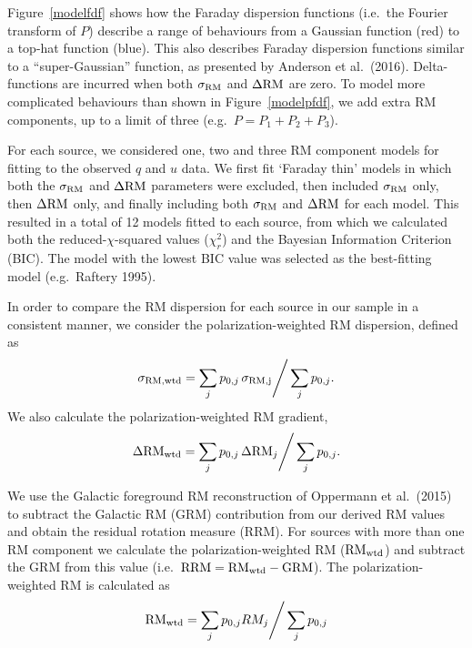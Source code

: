 \documentclass{mnras}
\newcommand*\sigmaRM{\sigma_{\rm RM}}
\newcommand*\sigmaRMwtd{\sigma_{\rm RM, wtd}}
\newcommand*\DeltaRM{\Delta{\rm RM}}
\begin{document}
Figure~\ref{modelfdf} shows how the Faraday dispersion functions (i.e.~the Fourier transform of $P$) describe a range of behaviours from a Gaussian function (red) to a top-hat function (blue). 
This also describes Faraday dispersion functions similar to a ``super-Gaussian'' function, as presented by Anderson et al.~(2016). 
Delta-functions are incurred when both $\sigmaRM$ and $\DeltaRM$ are zero. 
To model more complicated behaviours than shown in Figure~\ref{modelpfdf}, we add extra RM components, up to a limit of three (e.g.~$P=P_1+P_2+P_3$). 

For each source, we considered one, two and three RM component models for fitting to the observed $q$ and $u$ data.  
We first fit `Faraday thin' models in which both the $\sigmaRM$ and $\DeltaRM$ parameters were excluded, then included $\sigmaRM$ only, then $\DeltaRM$ only, and finally including both $\sigmaRM$ and $\DeltaRM$ for each model. This resulted in a total of 12 models fitted to each source, from which we calculated both the reduced-$\chi$-squared values ($\chi^2_r$) and the Bayesian Information Criterion (BIC). The model with the lowest BIC value was selected as the best-fitting model (e.g.~Raftery 1995). 	

In order to compare the RM dispersion for each source in our sample in a consistent manner, we consider the polarization-weighted RM dispersion, defined as
\begin{equation}
\sigmaRMwtd = \sum_j  p_{0,j}  \, \sigma_{\rm RM,j}  \Bigg/ \sum_j p_{0,j} .
\label{sigmaRMwtdeqn}
\end{equation}
We also calculate the polarization-weighted RM gradient,
\begin{equation}
\DeltaRM_{\rm wtd} = \sum_j  p_{0,j}  \, \Delta {\rm RM}_j \Bigg/ \sum_j p_{0,j} .
\label{deltaRMwtdeqn}
\end{equation}

We use the Galactic foreground RM reconstruction of Oppermann et al.~(2015) to subtract the Galactic RM (GRM) contribution from our derived RM values and obtain the residual rotation measure (RRM). For sources with more than one RM component we calculate the polarization-weighted RM (${\rm RM}_{\rm wtd}$) and subtract the GRM from this value (i.e.~${\rm RRM} = {\rm RM}_{\rm wtd} - {\rm GRM}$). 
The polarization-weighted RM is calculated as 
\begin{equation}
{\rm RM}_{\rm wtd} = \sum_j p_{0,j} RM_j \Bigg/ \sum_j p_{0,j} 
\label{RMwtdeqn}
\end{equation}
\end{document}
